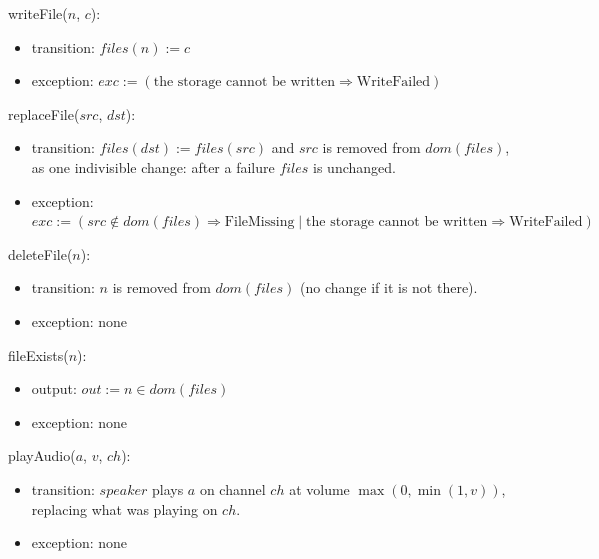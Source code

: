 \documentclass[10pt, titlepage]{article}
\newcommand{\T}[1]{\mathit{#1}}          %
\newcommand{\out}{\mathit{out}}
\newcommand{\exc}{\mathit{exc}}
\begin{document}
\begin{samepage}
\noindent writeFile($n$, $c$):
\begin{itemize}
\item transition: $\T{files}(n) := c$
\item exception: $\exc := (\text{the storage cannot be written} \Rightarrow
  \text{WriteFailed})$
\end{itemize}
\end{samepage}
\par\pagebreak[0]

\begin{samepage}
\noindent replaceFile($\T{src}$, $\T{dst}$):
\begin{itemize}
\item transition: $\T{files}(\T{dst}) := \T{files}(\T{src})$ and $\T{src}$ is
  removed from $\T{dom}(\T{files})$, as one indivisible change: after a failure
  $\T{files}$ is unchanged.
\item exception: $\exc := (\T{src} \notin \T{dom}(\T{files}) \Rightarrow
  \text{FileMissing} \mid \text{the storage cannot be written} \Rightarrow
  \text{WriteFailed})$
\end{itemize}
\end{samepage}
\par\pagebreak[0]

\begin{samepage}
\noindent deleteFile($n$):
\begin{itemize}
\item transition: $n$ is removed from $\T{dom}(\T{files})$ (no change if it
  is not there).
\item exception: none
\end{itemize}
\end{samepage}
\par\pagebreak[0]

\begin{samepage}
\noindent fileExists($n$):
\begin{itemize}
\item output: $\out := n \in \T{dom}(\T{files})$
\item exception: none
\end{itemize}
\end{samepage}
\par\pagebreak[0]

\begin{samepage}
\noindent playAudio($a$, $v$, $\T{ch}$):
\begin{itemize}
\item transition: $\T{speaker}$ plays $a$ on channel $\T{ch}$ at volume
  $\max(0, \min(1, v))$, replacing what was playing on $\T{ch}$.
\item exception: none
\end{itemize}
\end{samepage}
\par\pagebreak[0]
\end{document}
